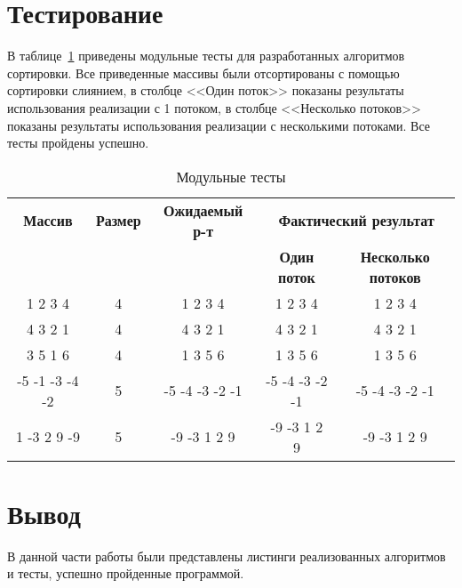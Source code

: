 \section{Тестирование}
В таблице~\ref{t:mod_tests} приведены модульные  тесты для разработанных алгоритмов сортировки. Все приведенные массивы были отсортированы с помощью сортировки слиянием, в столбце <<Один поток>> показаны результаты использования реализации с 1 потоком,  в столбце <<Несколько потоков>> показаны результаты использования реализации с несколькими потоками. Все тесты пройдены успешно.
\begin{table}[ht]
	\small
	\begin{center}
		\begin{threeparttable}
			\caption{Модульные тесты}
			\label{t:mod_tests}
			\begin{tabular}{|c|c|c|c|c|}
				\hline
				\bfseries Массив
				& \bfseries Размер
				& \bfseries Ожидаемый р-т
				& \multicolumn{2}{c|}{\bfseries Фактический результат} \\ \cline{4-5}
				& & & \bfseries Один поток & \bfseries  Несколько потоков \\
				\hline
				1 2 3 4  & 4 & 1 2 3 4 & 1 2 3 4 & 1 2 3 4 \\
				\hline
				4 3 2 1 & 4 & 4 3 2 1 & 4 3 2 1 & 4 3 2 1 \\
				\hline
				3 5 1 6 & 4 & 1 3 5 6  & 1 3 5 6 & 1 3 5 6 \\
				\hline
				-5 -1 -3 -4 -2 & 5 & -5 -4 -3 -2 -1 & -5 -4 -3 -2 -1 & -5 -4 -3 -2 -1 \\
				\hline
				1 -3 2 9 -9 & 5 & -9 -3 1 2 9  & -9 -3 1 2 9 & -9 -3 1 2 9 \\
				\hline
			\end{tabular}	
		\end{threeparttable}	
	\end{center}
\end{table}

\section*{Вывод}
В данной части работы были представлены листинги реализованных алгоритмов и тесты, успешно пройденные программой.